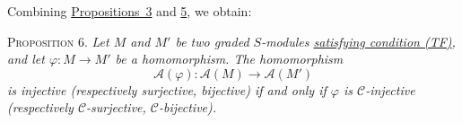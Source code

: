 Combining \hyperref[fac:III:2:no:58:prop:3]{Propositions~3} and
\hyperref[fac:III:2:no:58:prop:5]{5}, we obtain:

\label{fac:III:2:no:58:prop:6}
\textsc{Proposition 6.} \textit{Let $M$ and $M'$ be two graded
$S$-modules \hyperref[fac:III:2:no:56:def:TF]{satisfying condition (TF)},
and let $\varphi:M\to M'$ be a
homomorphism. The homomorphism}
\label{fac:III:2:no:58:formula:A-phi}
\[
\mathcal{A}(\varphi):\mathcal{A}(M)\longrightarrow\mathcal{A}(M')
\]
\textit{is injective (respectively surjective, bijective) if and only if
$\varphi$ is $\mathcal{C}$-injective (respectively
$\mathcal{C}$-surjective, $\mathcal{C}$-bijective).}
